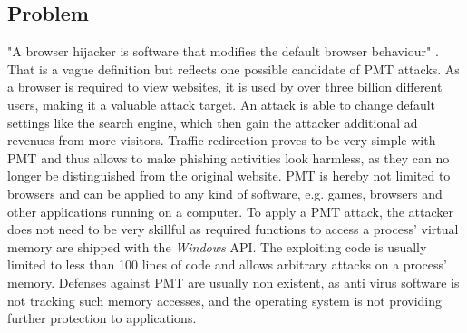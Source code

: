 \subsection{Problem}
"A browser hijacker is software that modifies the default browser behaviour" \cite{automatedspywarecollection}. That is a  vague definition but reflects one possible candidate of \gls{PMT} attacks. As a browser is required to view websites, it is used by over three billion \cite{cia} different users, making it a valuable attack target. An attack is able to change default settings like the search engine, which then gain the attacker additional ad revenues from more visitors. Traffic redirection proves to be very simple with \gls{PMT} and thus allows to make phishing activities look harmless, as they can no longer be distinguished from the original website. \gls{PMT} is hereby not limited to browsers and can be applied to any kind of software, e.g. games, browsers and other applications running on a computer. To apply a \gls{PMT} attack, the attacker does not need to be very skillful as required functions to access a process' virtual memory are shipped with the \emph{Windows} \gls{API}. The exploiting code is usually limited to less than 100 lines of code and allows arbitrary attacks on a process' memory. Defenses against \gls{PMT} are usually non existent, as anti virus software is not tracking such memory accesses, and the operating system is not providing further protection to applications.